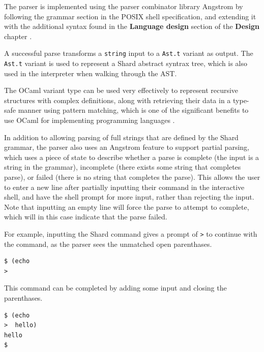 \documentclass[twoside]{report}
\begin{document}
The parser is implemented using the parser combinator library Angstrom by following the grammar section in the POSIX shell specification, and extending it with the additional syntax found in the \textbf{Language design} section of the \textbf{Design} chapter \cite{ocamlangstrom} \cite{posix2017}.

A successful parse transforms a \texttt{string} input to a \texttt{Ast.t} variant as output. The \texttt{Ast.t} variant is used to represent a Shard abstract syntrax tree, which is also used in the interpreter when walking through the AST.

The OCaml variant type can be used very effectively to represent recursive structures with complex definitions, along with retrieving their data in a type-safe manner using pattern matching, which is one of the significant benefits to use OCaml for implementing programming languages \cite{realworldocaml}.

In addition to allowing parsing of full strings that are defined by the Shard grammar, the parser also uses an Angstrom feature to support partial parsing, which uses a piece of state to describe whether a parse is complete (the input is a string in the grammar), incomplete (there exists some string that completes parse), or failed (there is no string that completes the parse).
This allows the user to enter a new line after partially inputting their command in the interactive shell, and have the shell prompt for more input, rather than rejecting the input.
Note that inputting an empty line will force the parse to attempt to complete, which will in this case indicate that the parse failed.

For example, inputting the Shard command gives a prompt of \texttt{>} to continue with the command, as the parser sees the unmatched open parenthases.

\begin{minipage}[c]{\textwidth-15pt}
  \begin{lstlisting}[language=shard]
$ (echo
>
\end{lstlisting}
  \smallskip
\end{minipage}

This command can be completed by adding some input and closing the parenthases.

\begin{minipage}[c]{\textwidth-15pt}
  \begin{lstlisting}[language=shard]
$ (echo
>  hello)
hello
$
\end{lstlisting}
  \smallskip
\end{minipage}
\end{document}
